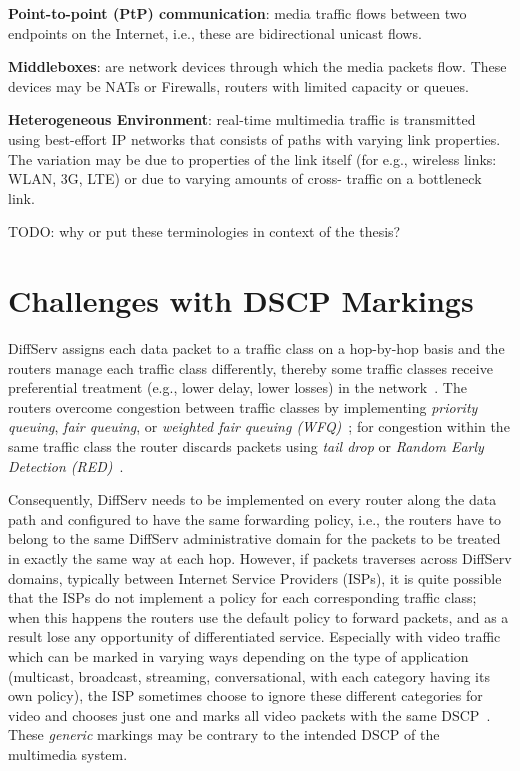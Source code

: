 \textbf{Point-to-point (PtP) communication}: media traffic flows between two
endpoints on the Internet, i.e., these are bidirectional unicast flows.

\textbf{Middleboxes}: are network devices through which the media packets
flow. These devices may be NATs or Firewalls, routers with limited capacity or
queues.

\textbf{Heterogeneous Environment}: real-time multimedia traffic is
transmitted using best-effort IP networks that consists of paths with varying
link properties. The variation may be due to properties of the link itself
(for e.g., wireless links: WLAN, 3G, LTE) or due to varying amounts of cross-
traffic on a bottleneck link.

 {\color{red} TODO: why or put these terminologies in context of the thesis?}


\section{Challenges with DSCP Markings}
\label{rg.ch.dscp}

DiffServ assigns each data packet to a traffic class on a hop-by-hop basis and
the routers manage each traffic class differently, thereby some traffic
classes receive preferential treatment (e.g., lower delay, lower losses) in
the network~\cite{rfc2475}. The routers overcome congestion between traffic
classes by implementing \emph{priority queuing}, \emph{fair queuing}, or
\emph{weighted fair queuing (WFQ)}~\cite{rfc4594}; for congestion within the
same traffic class the router discards packets using \emph{tail drop} or
\emph{Random Early Detection (RED)}~\cite{Floyd:RED}.

Consequently, DiffServ needs to be implemented on every router along the data
path and configured to have the same forwarding policy, i.e., the routers have
to belong to the same DiffServ administrative domain for the packets to be
treated in exactly the same way at each hop. However, if packets traverses
across DiffServ domains, typically between Internet Service Providers (ISPs),
it is quite possible that the ISPs do not implement a policy for each
corresponding traffic class; when this happens the routers use the default
policy to forward packets, and as a result lose any opportunity of
differentiated service. Especially with video traffic which can be marked in
varying ways depending on the type of application (multicast, broadcast,
streaming, conversational, with each category having its own policy), the ISP
sometimes choose to ignore these different categories for video and chooses
just one and marks all video packets with the same DSCP~\cite{rfc5865}. These
\emph{generic} markings may be contrary to the intended DSCP of the multimedia
system.

